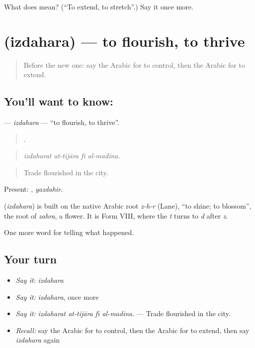 \begin{tcolorbox}[breakable,colback=teal!4,colframe=teal!35!black,title={Before you move on}]
What does  mean? (\textquotedblleft{}To extend, to stretch\textquotedblright{}.) Say it once more.
\end{tcolorbox}
\section[\texorpdfstring{\ar{ازدهر} (izdahara)}{ازدهر (izdahara)}]{ (izdahara) — to flourish, to thrive}

\label{lesson:AR-C331-izdahara}



\begin{quote}
Before the new one: say the Arabic for to control, then the Arabic for to extend.
\end{quote}

\subsection*{You'll want to know: }
\textbf{} — \emph{izdahara} — \textquotedblleft{}to flourish, to thrive\textquotedblright{}.

\begin{quote}
   .
\end{quote}

\begin{quote}
\emph{izdaharat at-tijāra fī al-madīna.}
\end{quote}

\begin{quote}
Trade flourished in the city.
\end{quote}

Present: , \emph{yazdahir}.

\begin{cousinweb}
\textbf{} (\emph{izdahara}) is built on the native Arabic root \emph{z-h-r} (Lane), \textquotedblleft{}to shine; to blossom\textquotedblright{}, the root of \emph{zahra}, a flower. It is Form VIII, where the \emph{t} turns to \emph{d} after \emph{z}.
\end{cousinweb}

\begin{grammarlens}[title={What you've built}]
One more word for telling what happened.
\end{grammarlens}

\subsection*{Your turn}
\begin{itemize}
\raggedright
  \item \emph{Say it:} \emph{izdahara}
  \item \emph{Say it:} \emph{izdahara}, once more
  \item \emph{Say it:} \emph{izdaharat at-tijāra fī al-madīna.} — Trade flourished in the city.
  \item \emph{Recall:} say the Arabic for to control, then the Arabic for to extend, then say \emph{izdahara} again
\end{itemize}


